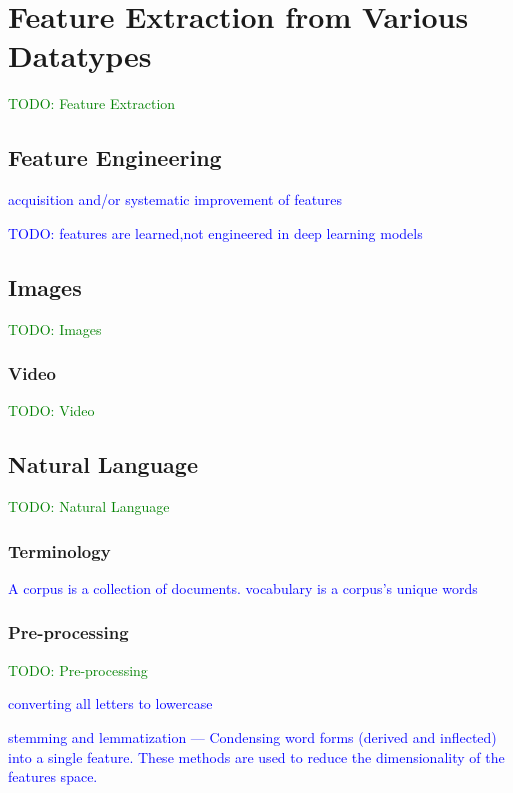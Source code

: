 \section{Feature Extraction from Various Datatypes}

\textcolor{green}{TODO: Feature Extraction}

\subsection{Feature Engineering}

\textcolor{blue}{acquisition and/or systematic improvement of features}

\textcolor{blue}{TODO: features are learned,not engineered in deep learning models}


\subsection{Images}

\textcolor{green}{TODO: Images}


\subsubsection{Video}

\textcolor{green}{TODO: Video}


\subsection{Natural Language}

\textcolor{green}{TODO: Natural Language}

\subsubsection{Terminology}

\textcolor{blue}{A {corpus} is a collection of documents. {vocabulary} is a corpus's unique words}

\subsubsection{Pre-processing}

\textcolor{green}{TODO: Pre-processing}

\textcolor{blue}{converting all letters to lowercase}

\textcolor{blue}{stemming and lemmatization --- Condensing word forms (derived and inflected) into a single feature. These methods are used to reduce the dimensionality of the features space.}

